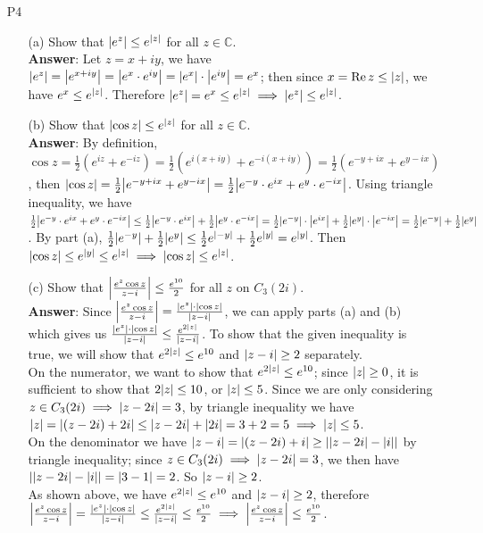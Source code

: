\documentclass{article}
\begin{document}
\newpage
\begin{itemize}
    \item [P4]
          \begin{itemize}
              \item [(a)] Show that $\abs{e^z}\leq e^{\abs{z}}$ for all $z\in\mathbb{C}$.\\
              \textbf{Answer}: Let $z=x+iy$, we have $\abs{e^z}=\abs{e^{x+iy}}=\abs{e^x\cdot e^{iy}}=\abs{e^x}\cdot\abs{e^{iy}}=e^x$; then since $x=\Re z\leq\abs{z}$, we have $e^x\leq e^{\abs{z}}$. Therefore $\abs{e^z}=e^x\leq e^{\abs{z}}\implies\abs{e^z}\leq e^{\abs{z}}$.
              \item [(b)] Show that $\abs{\cos z}\leq e^{\abs{z}}$ for all $z\in\mathbb{C}$.\\
              \textbf{Answer}: By definition, $\cos z=\frac{1}{2}(e^{iz}+e^{-iz})=\frac{1}{2}(e^{i(x+iy)}+e^{-i(x+iy)})=\frac{1}{2}(e^{-y+ix}+e^{y-ix})$, then $\abs{\cos z}=\frac{1}{2}\abs{e^{-y+ix}+e^{y-ix}}=\frac{1}{2}\abs{e^{-y}\cdot e^{ix}+e^{y}\cdot e^{-ix}}$. Using triangle inequality, we have $\frac{1}{2}\abs{e^{-y}\cdot e^{ix}+e^{y}\cdot e^{-ix}}\leq\frac{1}{2}\abs{e^{-y}\cdot e^{ix}}+\frac{1}{2}\abs{e^{y}\cdot e^{-ix}}=\frac{1}{2}\abs{e^{-y}}\cdot\abs{e^{ix}}+\frac{1}{2}\abs{e^{y}}\cdot\abs{e^{-ix}}=\frac{1}{2}\abs{e^{-y}}+\frac{1}{2}\abs{e^{y}}$. By part (a), $\frac{1}{2}\abs{e^{-y}}+\frac{1}{2}\abs{e^{y}}\leq\frac{1}{2}e^{\abs{-y}}+\frac{1}{2}e^{\abs{y}}=e^{\abs{y}}$. Then $\abs{\cos z}\leq e^{\abs{y}}\leq e^{\abs{z}}\implies\abs{\cos z}\leq e^{\abs{z}}$.
              \item [(c)] Show that $\abs{\frac{e^z\cos z}{z-i}}\leq\frac{e^{10}}{2}$ for all $z$ on $C_3(2i)$.\\
              \textbf{Answer}: Since $\abs{\frac{e^z\cos z}{z-i}}=\frac{\abs{e^z}\cdot\abs{\cos z}}{\abs{z-i}}$, we can apply parts (a) and (b) which gives us $\frac{\abs{e^z}\cdot\abs{\cos z}}{\abs{z-i}}\leq\frac{e^{2\abs{z}}}{\abs{z-i}}$. To show that the given inequality is true, we will show that $e^{2\abs{z}}\leq e^{10}$ and $\abs{z-i}\geq 2$ separately.\\
              On the numerator, we want to show that $e^{2\abs{z}}\leq e^{10}$; since $\abs{z}\geq 0$, it is sufficient to show that $2\abs{z}\leq 10$, or $\abs{z}\leq 5$. Since we are only considering $z\in C_3(2i)\implies\abs{z-2i}=3$, by triangle inequality we have $\abs{z}=\abs{(z-2i)+2i}\leq\abs{z-2i}+\abs{2i}=3+2=5\implies\abs{z}\leq 5$.\\
              On the denominator we have $\abs{z-i}=\abs{(z-2i)+i}\geq\abs{\abs{z-2i}-\abs{i}}$ by triangle inequality; since $z\in C_3(2i)\implies\abs{z-2i}=3$, we then have $\abs{\abs{z-2i}-\abs{i}}=\abs{3-1}=2$. So $\abs{z-i}\geq 2$.\\
              As shown above, we have $e^{2\abs{z}}\leq e^{10}$ and $\abs{z-i}\geq 2$, therefore $\abs{\frac{e^z\cos z}{z-i}}=\frac{\abs{e^z}\cdot\abs{\cos z}}{\abs{z-i}}\leq\frac{e^{2\abs{z}}}{\abs{z-i}}\leq\frac{e^{10}}{2}\implies\abs{\frac{e^z\cos z}{z-i}}\leq\frac{e^{10}}{2}$.
          \end{itemize}
\end{itemize}
\end{document}
